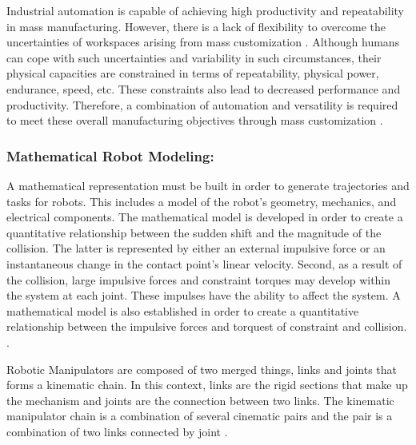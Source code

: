 Industrial automation is capable of achieving high productivity and repeatability in mass manufacturing. However, there is a lack of flexibility to overcome the uncertainties of workspaces arising from mass customization \cite{accorsi_application_2019}. Although humans can cope with such uncertainties and variability in such circumstances, their physical capacities are constrained in terms of repeatability, physical power, endurance, speed, etc. These constraints also lead to decreased performance and productivity. Therefore, a combination of automation and versatility is required to meet these overall manufacturing objectives through mass customization \cite{el_zaatari_cobot_2019}.   

\subsubsection*{Mathematical Robot Modeling:}
A mathematical representation must be built in order to generate trajectories and tasks for robots. This includes a model of the robot's geometry, mechanics, and electrical components. The mathematical model is developed in order to create a quantitative relationship between the sudden shift and the magnitude of the collision. The latter is represented by either an external impulsive force or an instantaneous change in the contact point's linear velocity. Second, as a result of the collision, large impulsive forces and constraint torques may develop within the system at each joint. These impulses have the ability to affect the system. A mathematical model is also established in order to create a quantitative relationship between the impulsive forces and torquest of constraint and collision.  \cite{zheng_mathematical_1985}.

Robotic Manipulators are composed of two merged things, links and joints that forms a kinematic chain. In this context, links are the rigid sections that make up the mechanism and joints are the connection between two links. The kinematic manipulator chain is a combination of several cinematic pairs and the pair is a combination of two links connected by joint \cite{al-naimi_robotics_nodate}.

